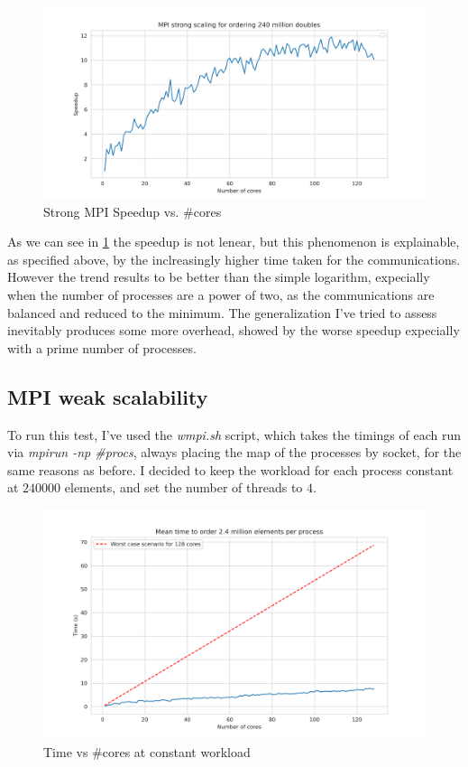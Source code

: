 \documentclass{article}
\begin{document}
	\begin{figure}[h]
		\centering
		\includegraphics[width=0.7\linewidth]{../exercise2/plots/mpi_scaling}
		\caption[Strong MPI Speedup]{Strong MPI Speedup vs. \#cores}
		\label{fig:mpiscaling}
	\end{figure}
	
	
	As we can see in \ref{fig:mpiscaling} the speedup is not lenear, but this phenomenon is explainable, as specified above, by the inclreasingly higher time taken for the communications. However the trend results to be better than the simple logarithm, expecially when the number of processes are a power of two, as the communications are balanced and reduced to the minimum.
	The generalization I've tried to assess inevitably produces some more overhead, showed by the worse speedup expecially with a prime number of processes.
	
	\subsection{MPI weak scalability}
	
	To run this test, I've used the \textit{wmpi.sh} script, which takes the timings of each run via \textit{mpirun -np \#procs}, always placing the map of the processes by socket, for the same reasons as before. I decided to keep the workload for each process constant at $240000$ elements, and set the number of threads to $4$.
	
	\begin{figure}[h]
		\centering
		\includegraphics[width=0.7\linewidth]{../exercise2/plots/wmpi_timings}
		\caption[wMPI Timings]{Time vs \#cores at constant workload}
		\label{fig:wmpitimings}
	\end{figure}
	
\end{document}
